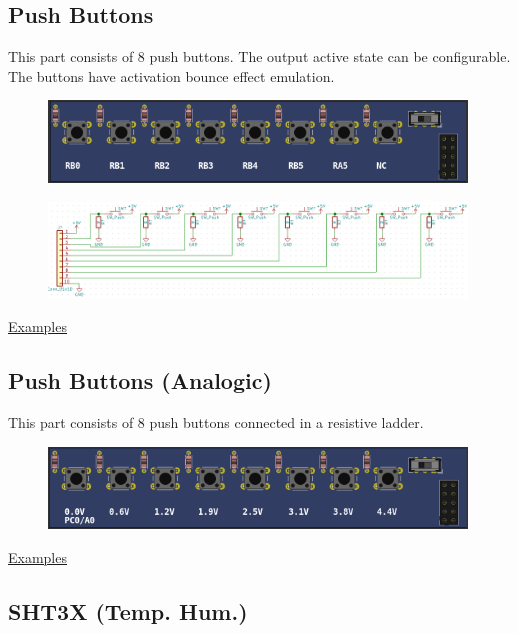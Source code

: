 \subsection{Push Buttons}

This part consists of 8 push buttons. The output active state can be configurable.
The buttons have activation bounce effect emulation. 
\begin{figure}[H]
\center
\includegraphics[width=0.99\textwidth]{img/part_buttons.png} 
\end{figure} 

\begin{figure}[H]
\center
\includegraphics[width=0.99\textwidth]{img/part_buttons_.png} 
\end{figure} 

\href{https://lcgamboa.github.io/picsimlab_examples/parts_Push_Buttons.html}{Examples}


\subsection{Push Buttons (Analogic)}


This part consists of 8 push buttons connected in a resistive ladder.

\begin{figure}[H]
\center
\includegraphics[width=0.99\textwidth]{img/part_push_a.png} 
\end{figure}

\href{https://lcgamboa.github.io/picsimlab_examples/parts_Push_Buttons_(Analogic).html}{Examples}

\subsection{SHT3X (Temp. Hum.)}

